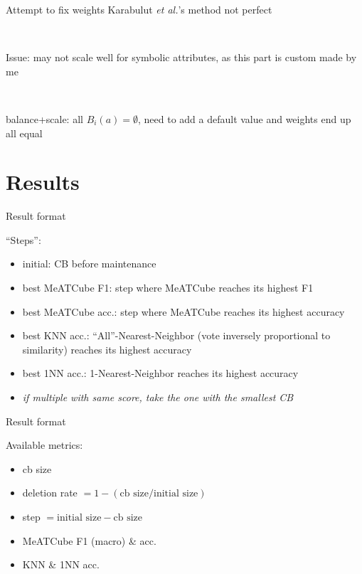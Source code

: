 \documentclass[]{beamer}
\begin{document}
\begin{frame}{Attempt to fix weights}
    Karabulut \textit{et al.}'s method not perfect

    ~

    Issue: may not scale well for symbolic attributes, as this part is custom made by me

    ~

    balance+scale: all $B_i(a)=\emptyset$, need to add a default value and weights end up all equal
\end{frame}

\section{Results}

\begin{frame}{Result format}

    ``Steps'':
    \begin{itemize}
        \item initial: CB before maintenance
        \item best MeATCube F1: step where MeATCube reaches its highest F1
        \item best MeATCube acc.: step where MeATCube reaches its highest accuracy
        \item best KNN acc.: ``All''-Nearest-Neighbor (vote inversely proportional to similarity) reaches its highest accuracy
        \item best 1NN acc.: 1-Nearest-Neighbor reaches its highest accuracy
        \item \textit{if multiple with same score, take the one with the smallest CB}
    \end{itemize}

\end{frame}
\begin{frame}{Result format}

    Available metrics:
    \begin{itemize}
        \item cb size
        \item deletion rate $= 1 - (\text{cb size}/\text{initial size})$
        \item step $= \text{initial size} - \text{cb size}$
        \item MeATCube F1 (macro) \& acc.
        \item KNN \& 1NN acc.
        \end{itemize}
\end{frame}
\end{document}
